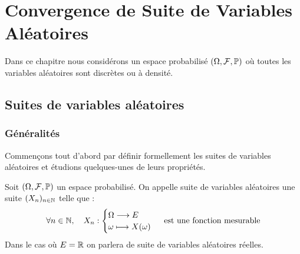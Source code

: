 \chapter{Convergence de Suite de Variables Aléatoires}

\justify

\setlength{\parindent}{0pt}
\renewcommand{\labelitemi}{\textbullet} %


Dans ce chapitre nous considérons un espace probabilisé $(\Omega, \mathcal{F}, \mathbb{P})$ où toutes les variables 
aléatoires sont discrètes ou à densité. 


\section{Suites de variables aléatoires}

\subsection{Généralités}

Commençons tout d'abord par définir formellement les suites de variables aléatoires et étudions quelques-unes 
de leurs propriétés. 

\begin{definition}
    Soit $(\Omega, \mathcal{F}, \mathbb{P})$ un espace probabilisé. On appelle suite de variables 
    aléatoires une suite $(X_n)_{n \in \mathbb{N}}$ telle que :
        \[ \forall n \in \mathbb{N}, \quad X_n : 
            \begin{cases}
                \Omega \longrightarrow E \\ 
                \omega \longmapsto X(\omega)
            \end{cases} \text{ est une fonction mesurable} \] 
    Dans le cas où $E = \mathbb{R}$ on parlera de suite de variables aléatoires réelles. 
\end{definition}


